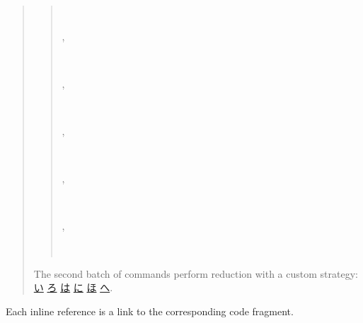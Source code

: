 \documentclass[a4paper]{article}
\begin{document}
\begin{quote}
\begin{quote}
\begin{alectryon}
\begin{sentence}
\begin{input}
      ~~~~~
    \end{input}
    \sep
    \begin{output}
      \begin{messages}
        \begin{message}
          ~\nl
          ~
        \end{message}
      \end{messages}
    \end{output}
  \end{sentence}
  \sep
  \begin{sentence}
    \begin{input}
      ~~~~~
    \end{input}
    \sep
    \begin{output}
      \begin{messages}
        \begin{message}
          ~\nl
          ~
        \end{message}
      \end{messages}
    \end{output}
  \end{sentence}
  \sep
  \begin{sentence}
    \begin{input}
      ~~~~~~
    \end{input}
    \sep
    \begin{output}
      \begin{messages}
        \begin{message}
          ~~~~~~~~~~\nl
          ~
        \end{message}
      \end{messages}
    \end{output}
  \end{sentence}
\end{alectryon}
\end{quote}

The second batch of commands perform reduction with a custom strategy: \hyperref[references-rst-cp-s-simpl0]{い} \hyperref[references-rst-cp-s-cbn0]{ろ} \hyperref[references-rst-cp-s-cbv0]{は} \hyperref[references-rst-cp-s-lazy0]{に} \hyperref[references-rst-cp-s-vm-compute0]{ほ} \hyperref[references-rst-cp-s-pattern0]{へ}.
\end{quote}

Each inline reference is a link to the corresponding code fragment.
\end{document}
